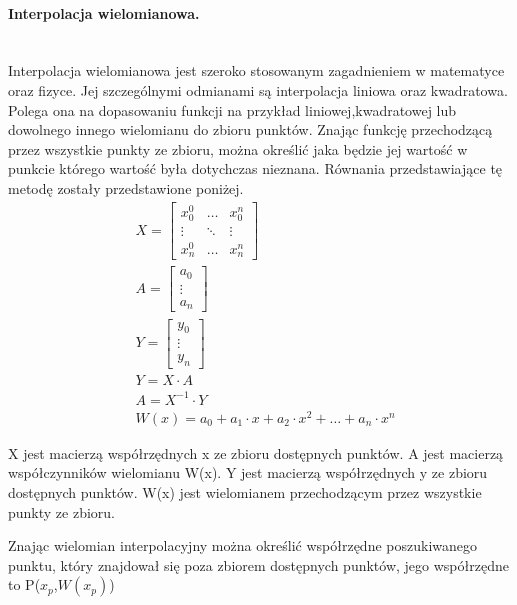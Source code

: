 \paragraph{Interpolacja wielomianowa.\newline}\\
Interpolacja wielomianowa jest szeroko stosowanym zagadnieniem w matematyce oraz fizyce. Jej szczególnymi odmianami są interpolacja liniowa oraz kwadratowa. Polega ona na dopasowaniu funkcji na przykład liniowej,kwadratowej lub dowolnego innego wielomianu do zbioru punktów. Znając funkcję przechodzącą przez wszystkie punkty ze zbioru, można określić jaka będzie jej wartość w punkcie którego wartość była dotychczas nieznana. Równania przedstawiające tę metodę zostały przedstawione poniżej.
\begin{equation}
    \begin{aligned}
            &X=\begin{bmatrix}
                    x_{0}^0 &\dots & x_{0}^n\\
                     \vdots  & \ddots & \vdots \\
                    x_{n}^0 &\dots & x_{n}^n
                \end{bmatrix}\\
            &A=\begin{bmatrix}
                    a_{0}\\
                      \vdots \\
                    a_{n}
                \end{bmatrix}\\
            &Y=\begin{bmatrix}
                y_{0}\\
                  \vdots \\
                y_{n}
            \end{bmatrix}\\
            &Y=X \cdot A\\
            &A=X^{-1} \cdot Y\\
            & W(x)=a_{0}+a_{1}\cdot x +a_{2}\cdot x^2+\ldots +a_{n}\cdot x^n
    \end{aligned}
\end{equation}

X jest macierzą współrzędnych x ze zbioru dostępnych punktów. A jest macierzą współczynników wielomianu W(x). Y jest macierzą współrzędnych y ze zbioru dostępnych punktów. W(x) jest wielomianem przechodzącym przez wszystkie punkty ze zbioru.

Znając wielomian interpolacyjny można określić współrzędne poszukiwanego punktu, który znajdował się poza zbiorem dostępnych punktów, jego współrzędne to P($x_{p}$,$W(x_{p})$)
